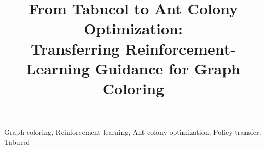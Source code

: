 \documentclass[conference]{IEEEtran}
\title{From Tabucol to Ant Colony Optimization:\\
Transferring Reinforcement-Learning Guidance for Graph Coloring}
\author{}
\begin{document}
\maketitle

\begin{abstract}

\end{abstract}

\begin{IEEEkeywords}
Graph coloring, Reinforcement learning, Ant colony optimization,
Policy transfer, Tabucol
\end{IEEEkeywords}


















\appendix

\end{document}
